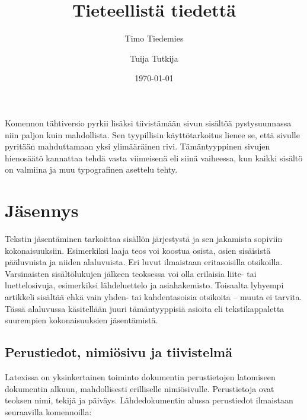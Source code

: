 \begin{koodilohkosis}
\enlargethispage{12bp}          %
\enlargethispage{-4bp}          %
\enlargethispage{\baselineskip} %
\end{koodilohkosis}

\noindent
Komennon tähtiversio  pyrkii lisäksi
tiivistämään sivun sisältöä pystysuunnassa niin paljon kuin mahdollista.
Sen tyypillisin käyttötarkoitus lienee se, että sivulle pyritään
mahduttamaan yksi ylimääräinen rivi. Tämäntyyppinen sivujen hienosäätö
kannattaa tehdä vasta viimeisenä eli siinä vaiheessa, kun kaikki sisältö
on valmiina ja muu typografinen asettelu tehty.

\section{Jäsennys}
\label{luku/jäsennys}

Tekstin jäsentäminen tarkoittaa sisällön järjestystä ja sen jakamista
sopiviin kokonaisuuksiin. Esimerkiksi laaja teos voi koostua osista,
osien sisäisistä pääluvuista ja niiden alaluvuista. Eri luvut ilmaistaan
eritasoisilla otsikoilla. Varsinaisten sisältölukujen jälkeen teoksessa
voi olla erilaisia liite- tai luettelosivuja, esimerkiksi lähdeluettelo
ja asiahakemisto. Toisaalta lyhyempi artikkeli sisältää ehkä vain yhden-
tai kahdentasoisia otsikoita -- muuta ei tarvita. Tässä alaluvussa
käsitellään juuri tämäntyyppisiä asioita eli tekstikappaletta suurempien
kokonaisuuksien jäsentämistä.

\subsection{Perustiedot, nimiösivu ja tiivistelmä}
\label{luku/dokumentin-perustiedot}

Latexissa on yksinkertainen toiminto dokumentin perustietojen latomiseen
dokumentin alkuun, mahdollisesti erilliselle nimiösivulle. Perustietoja
ovat teoksen nimi, tekijä ja päiväys. Lähdedokumentin alussa perustiedot
ilmaistaan seuraavilla komennoilla:

\begin{koodilohkosis}
\title{Tieteellistä tiedettä}              %
\author{Timo Tiedemies \and Tuija Tutkija} %
\date{\today}                              %
\end{koodilohkosis}

